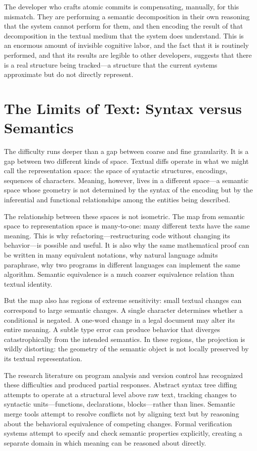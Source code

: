\documentclass[12pt, letterpaper]{article}
\begin{document}
The developer who crafts atomic commits is compensating, manually, for this mismatch. They are performing a semantic decomposition in their own reasoning that the system cannot perform for them, and then encoding the result of that decomposition in the textual medium that the system does understand. This is an enormous amount of invisible cognitive labor, and the fact that it is routinely performed, and that its results are legible to other developers, suggests that there is a real structure being tracked---a structure that the current systems approximate but do not directly represent.

\section{The Limits of Text: Syntax versus Semantics}

The difficulty runs deeper than a gap between coarse and fine granularity. It is a gap between two different kinds of space. Textual diffs operate in what we might call the representation space: the space of syntactic structures, encodings, sequences of characters. Meaning, however, lives in a different space---a semantic space whose geometry is not determined by the syntax of the encoding but by the inferential and functional relationships among the entities being described.

The relationship between these spaces is not isometric. The map from semantic space to representation space is many-to-one: many different texts have the same meaning. This is why refactoring---restructuring code without changing its behavior---is possible and useful. It is also why the same mathematical proof can be written in many equivalent notations, why natural language admits paraphrase, why two programs in different languages can implement the same algorithm. Semantic equivalence is a much coarser equivalence relation than textual identity.

But the map also has regions of extreme sensitivity: small textual changes can correspond to large semantic changes. A single character determines whether a conditional is negated. A one-word change in a legal document may alter its entire meaning. A subtle type error can produce behavior that diverges catastrophically from the intended semantics. In these regions, the projection is wildly distorting: the geometry of the semantic object is not locally preserved by its textual representation.

The research literature on program analysis and version control has recognized these difficulties and produced partial responses. Abstract syntax tree diffing attempts to operate at a structural level above raw text, tracking changes to syntactic units---functions, declarations, blocks---rather than lines. Semantic merge tools attempt to resolve conflicts not by aligning text but by reasoning about the behavioral equivalence of competing changes. Formal verification systems attempt to specify and check semantic properties explicitly, creating a separate domain in which meaning can be reasoned about directly.
\end{document}
